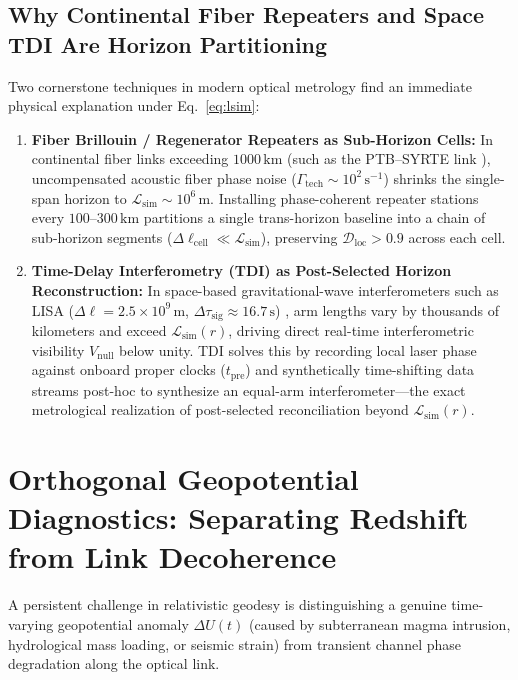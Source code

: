 \documentclass[11pt,a4paper]{article}
\begin{document}
\subsection{Why Continental Fiber Repeaters and Space TDI Are Horizon Partitioning}

Two cornerstone techniques in modern optical metrology find an immediate physical explanation under Eq.~\eqref{eq:lsim}:
\begin{enumerate}[leftmargin=1.6em]
    \item \textbf{Fiber Brillouin / Regenerator Repeaters as Sub-Horizon Cells:} In continental fiber links exceeding $1000\,\mathrm{km}$ (such as the PTB--SYRTE link \cite{lisdat2016}), uncompensated acoustic fiber phase noise ($\Gamma_{\mathrm{tech}} \sim 10^2\,\mathrm{s^{-1}}$) shrinks the single-span horizon to $\mathcal{L}_{\mathrm{sim}} \sim 10^6\,\mathrm{m}$. Installing phase-coherent repeater stations every $100$--$300\,\mathrm{km}$ partitions a single trans-horizon baseline into a chain of sub-horizon segments ($\Delta\ell_{\mathrm{cell}} \ll \mathcal{L}_{\mathrm{sim}}$), preserving $\mathcal{D}_{\mathrm{loc}} > 0.9$ across each cell.
    \item \textbf{Time-Delay Interferometry (TDI) as Post-Selected Horizon Reconstruction:} In space-based gravitational-wave interferometers such as LISA ($\Delta\ell = 2.5 \times 10^9\,\mathrm{m}$, $\Delta\tau_{\mathrm{sig}} \approx 16.7\,\mathrm{s}$) \cite{tinto2021}, arm lengths vary by thousands of kilometers and exceed $\mathcal{L}_{\mathrm{sim}}(r)$, driving direct real-time interferometric visibility $V_{\mathrm{null}}$ below unity. TDI solves this by recording local laser phase against onboard proper clocks ($t_{\mathrm{pre}}$) and synthetically time-shifting data streams post-hoc to synthesize an equal-arm interferometer---the exact metrological realization of post-selected reconciliation beyond $\mathcal{L}_{\mathrm{sim}}(r)$.
\end{enumerate}

\section{Orthogonal Geopotential Diagnostics: Separating Redshift from Link Decoherence}

A persistent challenge in relativistic geodesy is distinguishing a genuine time-varying geopotential anomaly $\Delta U(t)$ (caused by subterranean magma intrusion, hydrological mass loading, or seismic strain) from transient channel phase degradation along the optical link.
\end{document}
